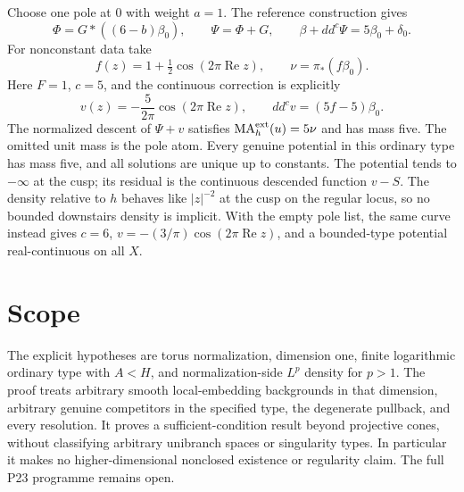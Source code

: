 \documentclass[11pt]{article}
\newcommand{\ddc}{dd^c}
\begin{document}
Choose one pole at $0$ with weight $a=1$. The reference construction
gives
\[
 \Phi=G*((6-b)\beta_0),\qquad \Psi=\Phi+G,
 \qquad \beta+\ddc\Psi=5\beta_0+\delta_0.
\]
For nonconstant data take
\[
 f(z)=1+\tfrac12\cos(2\pi\operatorname{Re}z),\qquad
 \nu=\pi_*(f\beta_0).
\]
Here $F=1$, $c=5$, and the continuous correction is explicitly
\[
 v(z)=-\frac5{2\pi}\cos(2\pi\operatorname{Re}z),
 \qquad \ddc v=(5f-5)\beta_0.
\]
The normalized descent of $\Psi+v$ satisfies
$\operatorname{MA}^{\rm ext}_h(u)=5\nu$ and has mass five.
The omitted unit mass is the pole atom. Every genuine potential in
this ordinary type has mass five, and all solutions are unique up
to constants. The potential tends to $-\infty$ at the cusp;
its residual is the continuous descended function $v-S$.
The density relative to $h$ behaves like $|z|^{-2}$ at the cusp
on the regular locus, so no bounded downstairs density is implicit.
With the empty pole list, the same curve instead gives $c=6$,
$v=-(3/\pi)\cos(2\pi\operatorname{Re}z)$, and a bounded-type
potential real-continuous on all $X$.

\section{Scope}
The explicit hypotheses are torus normalization, dimension one,
finite logarithmic ordinary type with $A<H$, and normalization-side
$L^p$ density for $p>1$. The proof treats arbitrary smooth local-embedding
backgrounds in that dimension, arbitrary genuine competitors in the
specified type, the degenerate pullback, and every resolution.
It proves a sufficient-condition result beyond projective cones,
without classifying arbitrary unibranch spaces or singularity types.
In particular it makes no higher-dimensional nonclosed existence or
regularity claim. The full P23 programme remains open.
\end{document}
